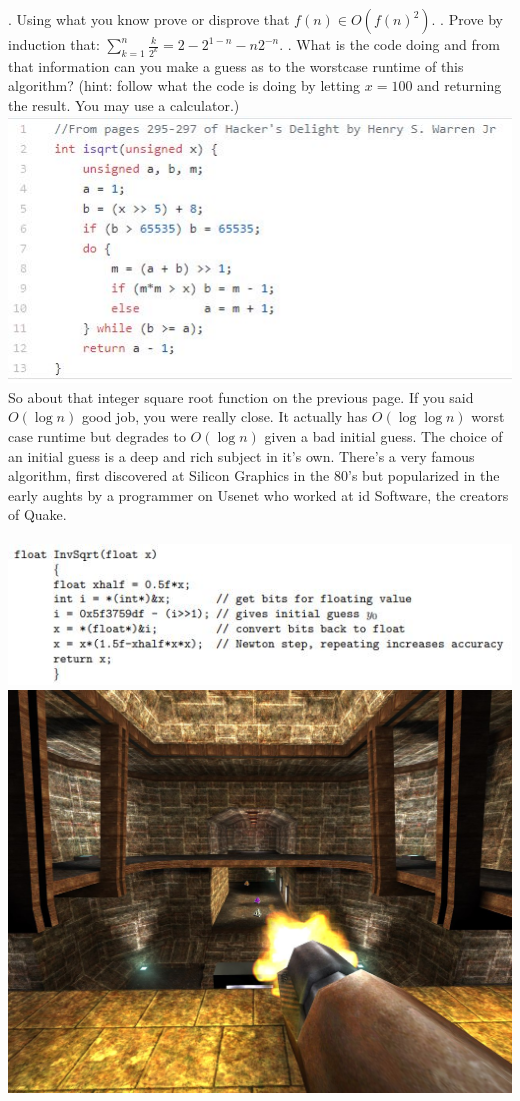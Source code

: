 \documentclass[12pt]{article}
\begin{document}
\newpage
{}. Using what you know prove or disprove that $f(n)\in O(f(n)^2)$.
\newpage
{}. Prove by induction that: $\sum\limits_{k=1}^{n}{\frac{k}{2^k}}=2-2^{1-n}-n2^{-n}$.
\newpage
{}. What is the code doing and from that information can you make a guess as to the worstcase runtime of this algorithm? (hint: follow what the code is doing by letting $x = 100$ and returning the result. You may use a calculator.)\\
\includegraphics[width=\linewidth]{isqrt.jpg}
\newpage
\noindent So about that integer square root function on the previous page. If you said $O(\log{n})$ good job, you were really close. It actually has $O(\log{\log{n}})$ worst case runtime but degrades to $O(\log{n})$ given a bad initial guess. The choice of an initial guess is a deep and rich subject in it's own. There's a very famous algorithm, first discovered at Silicon Graphics in the 80's but popularized in the early aughts by a programmer on Usenet who worked at id Software, the creators of Quake. \\\\
\includegraphics[scale =0.65]{fisqrt.jpg}  \includegraphics[scale =0.095]{qk.jpg}
\end{document}

